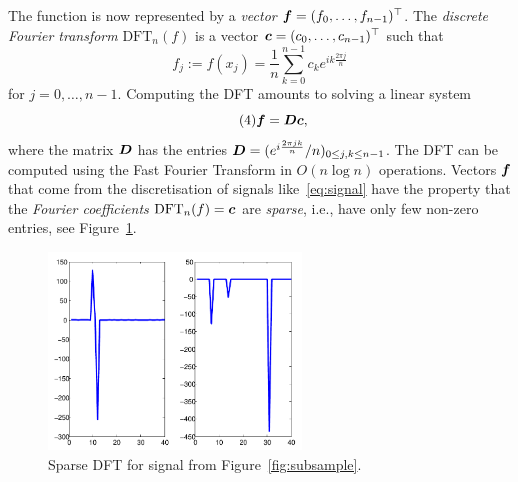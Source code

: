 \documentclass{article}
\begin{document}
The function is now represented by a {\em vector} $\bm{f}=(f_0,\dots,f_{n-1})^{\top}$. The {\em discrete Fourier transform} $\mathrm{DFT}_n(f)$ is a vector $\bm{c}=(c_0,\dots,c_{n-1})^{\top}$ such that
\begin{equation}\label{eq:discrete-fourier-sum}\tag{3}
 f_j := f(x_j) = \frac{1}{n}\sum_{k=0}^{n-1} c_k e^{ik\frac{2\pi j}{n}}
\end{equation}
for $j=0,\dots,n-1$.
Computing the DFT amounts to solving a linear system
\begin{equation}\label{eq:dft}\tag{4}
 \bm{f} = \bm{D} \bm{c},
\end{equation}
where the matrix $\bm{D}$ has the entries $\bm{D} = (e^{i\frac{2\pi jk}{n}}/n)_{0\leq j,k\leq n-1}$.
The DFT can be computed using the Fast Fourier Transform in $O(n\log n)$ operations. 
Vectors $\bm{f}$ that come from the discretisation of signals like~\eqref{eq:signal} have the property that the {\em Fourier coefficients} $\mathrm{DFT}_n(f)=\bm{c}$ are {\em sparse}, i.e., have only few non-zero entries, see Figure~\ref{fig:fourierex}.

\begin{figure}[h!]
 \centering
 \includegraphics[width=0.6\textwidth]{images/fourier_cropped.pdf}
 \caption{Sparse DFT for signal from Figure~\ref{fig:subsample}.}\label{fig:fourierex}
\end{figure}
\end{document}
